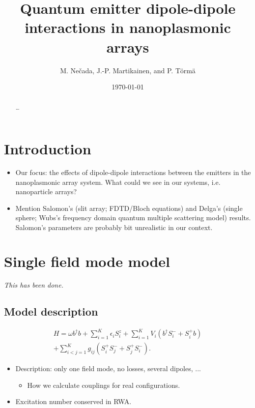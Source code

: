 \documentclass[pra,superscriptaddress,twocolumn,notitlepage,showpacs]{revtex4-1}
\begin{document}
\title{Quantum emitter dipole-dipole interactions in nanoplasmonic arrays}
\author{M. Ne\v{c}ada, J.-P. Martikainen, and P. T\"{o}rm\"{a}}
\date{\today}
\pacs{\dots}
\begin{abstract}
    \dots
\end{abstract}
\maketitle 


\section*{Introduction}
\begin{itemize}
\item Our focus: the effects of dipole-dipole interactions between the emitters
in the nanoplasmonic array system. What could we see in our systems,
i.e. nanoparticle arrays?
\item Mention Salomon's (slit array; FDTD/Bloch equations) and Delga's (single
sphere; Wubs's frequency domain quantum multiple scattering model)
results. Salomon's parameters are probably bit unrealistic in our
context.
\end{itemize}

\section*{Single field mode model}

\emph{This has been done.}


\subsection*{Model description}
\begin{multline}
H=\omega b^{\dagger}b+\sum_{i=1}^{K}\epsilon_{i}S_{i}^{z}+\sum_{i=1}^{K}V_{i}\left(b^{\dagger}S_{i}^{-}+S_{i}^{+}b\right)\\+\sum_{i<j=1}^{K}g_{ij}\left(S_{i}^{+}S_{j}^{-}+S_{j}^{+}S_{i}^{-}\right).
\end{multline}

\begin{itemize}
\item Description: only one field mode, no losses, several dipoles, ...

\begin{itemize}
\item How we calculate couplings for real configurations.
\end{itemize}
\item Excitation number conserved in RWA.
\end{itemize}
\end{document}
